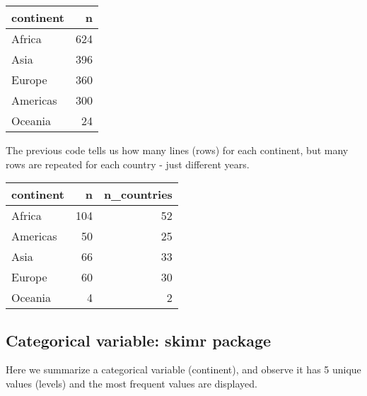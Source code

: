 \documentclass[
]{book}
\newenvironment{Shaded}{\begin{snugshade}}{\end{snugshade}}
\newcommand{\DataTypeTok}[1]{\textcolor[rgb]{0.13,0.29,0.53}{#1}}
\newcommand{\DecValTok}[1]{\textcolor[rgb]{0.00,0.00,0.81}{#1}}
\newcommand{\KeywordTok}[1]{\textcolor[rgb]{0.13,0.29,0.53}{\textbf{#1}}}
\newcommand{\NormalTok}[1]{#1}
\newcommand{\OperatorTok}[1]{\textcolor[rgb]{0.81,0.36,0.00}{\textbf{#1}}}
\newcommand{\StringTok}[1]{\textcolor[rgb]{0.31,0.60,0.02}{#1}}
\begin{document}
\begin{tabular}{l|r}
\hline
continent & n\\
\hline
Africa & 624\\
\hline
Asia & 396\\
\hline
Europe & 360\\
\hline
Americas & 300\\
\hline
Oceania & 24\\
\hline
\end{tabular}

The previous code tells us how many lines (rows) for each continent, but many rows are repeated for each country - just different years.

\begin{Shaded}
\end{Shaded}

\begin{tabular}{l|r|r}
\hline
continent & n & n\_countries\\
\hline
Africa & 104 & 52\\
\hline
Americas & 50 & 25\\
\hline
Asia & 66 & 33\\
\hline
Europe & 60 & 30\\
\hline
Oceania & 4 & 2\\
\hline
\end{tabular}

\hypertarget{categorical-variable-skimr-package}{%
\subsection{Categorical variable: skimr package}\label{categorical-variable-skimr-package}}

Here we summarize a categorical variable (continent), and observe it has 5 unique values (levels) and the most frequent values are displayed.
\end{document}
